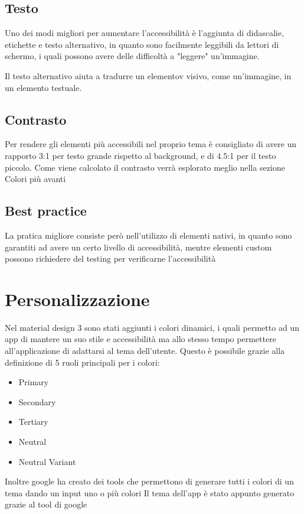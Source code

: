 \documentclass[12pt, a4paper]{report}
\begin{document}
		\subsection{Testo}
			Uno dei modi migliori per aumentare l'accessibilità è l'aggiunta di didascalie, etichette e testo alternativo, in quanto sono facilmente leggibili da lettori di schermo, i quali possono avere delle difficoltà a "leggere" un'immagine.
			
			Il testo alternativo aiuta a tradurre un elementov visivo, come un'immagine, in un elemento testuale.
		\subsection{Contrasto}
			Per rendere gli elementi più accessibili nel proprio tema è consigliato di avere un rapporto 3:1 per testo grande rispetto al background, e di 4.5:1 per il testo piccolo. Come viene calcolato il contrasto verrà esplorato meglio nella sezione Colori più avanti

		\subsection{Best practice}
			La pratica migliore consiste però nell'utilizzo di elementi nativi, in quanto sono garantiti ad avere un certo livello di accessibilità, mentre elementi custom possono richiedere del testing per verificarne l'accessibilità
	\section{Personalizzazione}
		Nel material design 3 sono stati aggiunti i colori dinamici, i quali permetto ad un app di mantere un suo stile e accessibilità ma allo stesso tempo permettere all'applicazione di adattarsi al tema dell'utente.
		Questo è possibile grazie alla definizione di 5 ruoli principali per i colori:
		\begin{itemize}
			\item Primary
			\item Secondary
			\item Tertiary
			\item Neutral
			\item Neutral Variant
		\end{itemize}
		Inoltre google ha creato dei tools che permettono di generare tutti i colori di un tema dando un input uno o più colori
		Il tema dell'app è stato appunto generato grazie al tool di google
		
\end{document}
